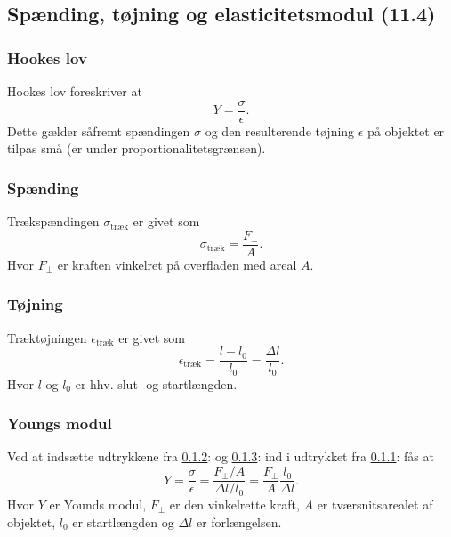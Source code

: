 \subsection{Spænding, tøjning og elasticitetsmodul (11.4)}

\subsubsection{Hookes lov} \label{afs:hooke}
Hookes lov foreskriver at
\[ 
Y = \frac{\sigma}{\epsilon}
.\]
Dette gælder såfremt spændingen $\sigma$ og den resulterende tøjning $\epsilon$ på objektet er tilpas små (er under proportionalitetsgrænsen).

\subsubsection{Spænding} \label{afs:stress}
Trækspændingen $\sigma_{\text{træk}}$ er givet som
\[ 
\sigma_{\text{træk}} = \frac{F_{\perp}}{A}
.\]
Hvor $F_{\perp}$ er kraften vinkelret på overfladen med areal $A$.


\subsubsection{Tøjning} \label{afs:strain}
Træktøjningen $\epsilon_{\text{træk}}$ er givet som
\[ 
\epsilon_{\text{træk}} = \frac{l - l_0}{l_0} = \frac{\Delta l}{l_0}
.\]
Hvor $l$ og $l_0$ er hhv. slut- og startlængden.


\subsubsection{Youngs modul} \label{afs:young}
Ved at indsætte udtrykkene fra \ref{afs:stress}:  og \ref{afs:strain}:  ind i udtrykket fra \ref{afs:hooke}:  fås at
\[
  Y = \frac{\sigma}{\epsilon} = \frac{F_{\perp} / A}{\Delta l / l_0} = \frac{F_{\perp}}{A} \frac{l_0}{\Delta l}
.\]
Hvor $Y$ er Younds modul, $F_{\perp}$ er den vinkelrette kraft, $A$ er tværsnitsarealet af objektet, $l_0$ er startlængden og $\Delta l$ er forlængelsen.



